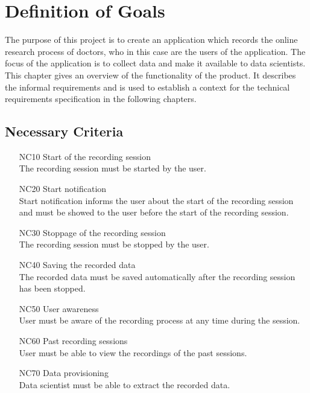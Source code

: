 \chapter{Definition of Goals}
\label{ch:goals}

The purpose of this project is to create an application which records the online research process of doctors, who in this case are the users of the application. The focus of the application is to collect data and make it available to data scientists. This chapter gives an overview of the functionality of the product. It describes the informal requirements and is used to establish a context for the technical requirements specification in the following chapters.

\section{Necessary Criteria}

\begin{itemize}

	\item[NC10]Start of the recording session\\The recording session must be started by the user.
	\item[NC20]Start notification\\Start notification informs the user about the start of the recording session and must be showed to the user before the start of the recording session. 
	\item[NC30]Stoppage of the recording session\\The recording session must be stopped by the user.
	\item[NC40]Saving the recorded data\\The recorded data must be saved automatically after the recording session has been stopped.
	\item[NC50]User awareness\\ User must be aware of the recording process at any time during the session.
	\item[NC60]Past recording sessions\\ User must be able to view the recordings of the past sessions.
	\item[NC70]Data provisioning\\ Data scientist must be able to extract the recorded data.
	
\end{itemize}

